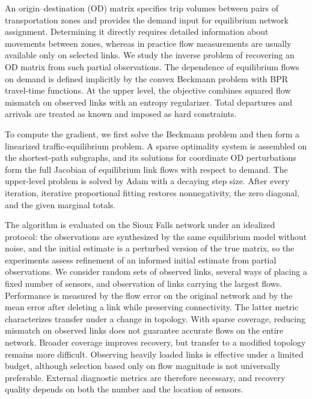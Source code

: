 \documentclass{crm-article}
\begin{document}

\begin{abstracteng}
An origin--destination (OD) matrix specifies trip volumes between pairs of
transportation zones and provides the demand input for equilibrium network
assignment. Determining it directly requires detailed information about
movements between zones, whereas in practice flow measurements are usually
available only on selected links. We study the inverse problem of recovering
an OD matrix from such partial observations. The dependence of equilibrium
flows on demand is defined implicitly by the convex Beckmann problem with BPR
travel-time functions. At the upper level, the objective combines squared flow
mismatch on observed links with an entropy regularizer. Total departures and
arrivals are treated as known and imposed as hard constraints.

To compute the gradient, we first solve the Beckmann problem and then
form a linearized traffic-equilibrium problem. A sparse optimality system is
assembled on the shortest-path subgraphs, and its solutions for coordinate OD
perturbations form the full Jacobian of equilibrium link flows with respect to
demand. The upper-level problem is solved by Adam with a decaying step size.
After every iteration, iterative proportional fitting restores nonnegativity,
the zero diagonal, and the given marginal totals.

The algorithm is evaluated on the Sioux Falls network under an idealized
protocol: the observations are synthesized by the same equilibrium model
without noise, and the initial estimate is a perturbed version of the true
matrix, so the experiments assess refinement of an informed initial
estimate from partial observations. We consider random
sets of observed links, several ways of placing a fixed number of sensors, and
observation of links carrying the largest flows. Performance is measured by
the flow error on the original network and by the mean error after deleting a
link while preserving connectivity. The latter metric characterizes transfer
under a change in topology. With sparse coverage, reducing mismatch on
observed links does not guarantee accurate flows on the entire network.
Broader coverage improves recovery, but transfer to a modified topology
remains more difficult. Observing heavily loaded links is effective under a
limited budget, although selection based only on flow magnitude is not
universally preferable. External diagnostic metrics are therefore necessary,
and recovery quality depends on both the number and the location of sensors.
\end{abstracteng}
\end{document}
